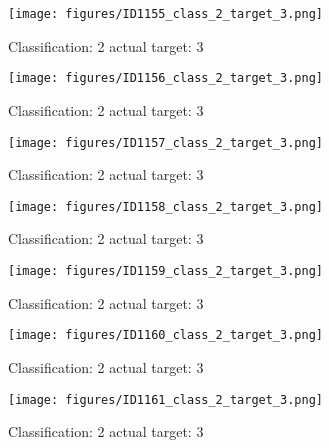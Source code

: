 \begin{figure}[h!]
\begin{center}
\texttt{[image: figures/ID1155\_class\_2\_target\_3.png]}
\end{center}
\caption{ Classification: 2 actual target: 3}
\label{fig:ID1155_class_2_target_3}
\end{figure}
\begin{figure}[h!]
\begin{center}
\texttt{[image: figures/ID1156\_class\_2\_target\_3.png]}
\end{center}
\caption{ Classification: 2 actual target: 3}
\label{fig:ID1156_class_2_target_3}
\end{figure}
\begin{figure}[h!]
\begin{center}
\texttt{[image: figures/ID1157\_class\_2\_target\_3.png]}
\end{center}
\caption{ Classification: 2 actual target: 3}
\label{fig:ID1157_class_2_target_3}
\end{figure}
\begin{figure}[h!]
\begin{center}
\texttt{[image: figures/ID1158\_class\_2\_target\_3.png]}
\end{center}
\caption{ Classification: 2 actual target: 3}
\label{fig:ID1158_class_2_target_3}
\end{figure}
\begin{figure}[h!]
\begin{center}
\texttt{[image: figures/ID1159\_class\_2\_target\_3.png]}
\end{center}
\caption{ Classification: 2 actual target: 3}
\label{fig:ID1159_class_2_target_3}
\end{figure}
\begin{figure}[h!]
\begin{center}
\texttt{[image: figures/ID1160\_class\_2\_target\_3.png]}
\end{center}
\caption{ Classification: 2 actual target: 3}
\label{fig:ID1160_class_2_target_3}
\end{figure}
\begin{figure}[h!]
\begin{center}
\texttt{[image: figures/ID1161\_class\_2\_target\_3.png]}
\end{center}
\caption{ Classification: 2 actual target: 3}
\label{fig:ID1161_class_2_target_3}
\end{figure}
